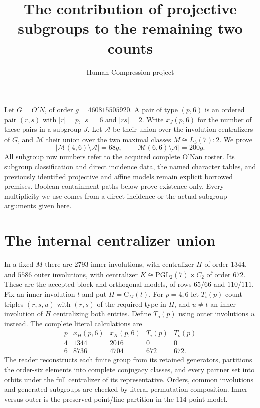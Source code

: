 \documentclass[11pt,a4paper]{article}
\title{The contribution of projective subgroups to the remaining two counts}
\author{Human Compression project}\date{}
\newcommand{\C}{\mathrm C}\newcommand{\N}{\mathrm N}\newcommand{\Z}{\mathrm Z}
\begin{document}
\maketitle
Let $G=O'N$, of order $g=460815505920$. A pair of type $(p,6)$ is
an ordered pair $(r,s)$ with $|r|=p$, $|s|=6$ and $|rs|=2$.
Write $x_J(p,6)$ for the number of these pairs in a subgroup $J$.
Let $\mathcal A$ be their union over the involution centralizers
of $G$, and $\mathcal M$ their union over the two maximal classes
$M\cong L_3(7):2$. We prove
\[
 |\mathcal M(4,6)\setminus\mathcal A|=68g,\qquad
 |\mathcal M(6,6)\setminus\mathcal A|=200g.                 \tag{1}
\]
All subgroup row numbers refer to the acquired complete O'Nan roster.
Its subgroup classification and direct incidence data, the named
character tables, and previously identified projective and affine
models remain explicit borrowed premises. Boolean containment paths
below prove existence only. Every multiplicity we use comes from a
direct incidence or the actual-subgroup arguments given here.

\section*{The internal centralizer union}
In a fixed $M$ there are $2793$ inner involutions, with centralizer
$H$ of order $1344$, and $5586$ outer involutions, with centralizer
$K\cong\mathrm{PGL}_2(7)\times C_2$ of order $672$.
These are the accepted block and orthogonal models, of rows $65/66$
and $110/111$. Fix an inner involution $t$ and put $H=\C_M(t)$.
For $p=4,6$ let $T_i(p)$ count triples $(r,s,u)$ with $(r,s)$ of
the required type in $H$, and $u\ne t$ an inner involution of $H$
centralizing both entries. Define $T_o(p)$ using outer involutions
$u$ instead. The complete literal calculations are
\[
\begin{array}{c|rrrr}
p&x_H(p,6)&x_K(p,6)&T_i(p)&T_o(p)\\\hline
4&1344&2016&0&0\\
6&8736&4704&672&672.
\end{array}                                                \tag{2}
\]
The reader reconstructs each finite group from its retained generators,
partitions the order-six elements into complete conjugacy classes,
and every partner set into orbits under the full centralizer of its
representative. Orders, common involutions and generated subgroups
are checked by literal permutation composition. Inner versus outer
is the preserved point/line partition in the 114-point model.
\end{document}
